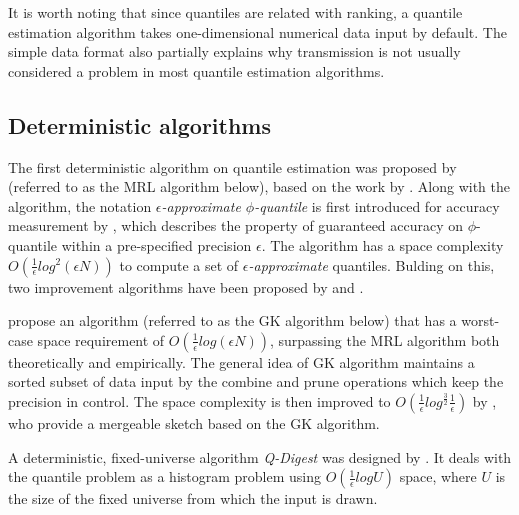 It is worth noting that since quantiles are related with ranking, a quantile estimation algorithm takes one-dimensional numerical data input by default. The simple data format also partially explains why transmission is not usually considered a problem in most quantile estimation algorithms.
\subsection{Deterministic algorithms}
\label{deterministic}
The first deterministic algorithm on quantile estimation was proposed by \citeauthor{mankuApproximateMediansOthera}\cite{mankuApproximateMediansOthera} (referred to as the MRL algorithm below), based on the work by \citeauthor{munroSelectionSortingLimited1980}\cite{munroSelectionSortingLimited1980}. Along with the algorithm, the notation \textit{$\epsilon$-approximate $\phi$-quantile} is first introduced for accuracy measurement by \citeauthor{mankuApproximateMediansOthera}, which describes the property of guaranteed accuracy on $\phi$-quantile within a pre-specified precision $\epsilon$. The algorithm has a space complexity $O(\frac{1}{\epsilon}log^2 (\epsilon N))$ to compute a set of \textit{$\epsilon$-approximate} quantiles. Bulding on this, two improvement algorithms have been proposed by \citeauthor{greenwaldQuantilesEquidepthHistograms2016a}\cite{greenwaldQuantilesEquidepthHistograms2016a} and \citeauthor{shrivastavaMediansNewAggregation2004}\cite{shrivastavaMediansNewAggregation2004}.

\citeauthor{greenwaldQuantilesEquidepthHistograms2016a}\cite{greenwaldQuantilesEquidepthHistograms2016a} propose an algorithm (referred to as the GK algorithm below) that has a worst-case space requirement of $O(\frac{1}{\epsilon}log(\epsilon N))$, surpassing the MRL algorithm both theoretically and empirically. The general idea of GK algorithm maintains a sorted subset of data input by the combine and prune operations which keep the precision in control. The space complexity is then improved to $O(\frac{1}{\epsilon}log^{\frac{3}{2}}\frac{1}{\epsilon})$ by \citeauthor{agarwalMergeableSummaries}\cite{agarwalMergeableSummaries}, who provide a mergeable sketch based on the GK algorithm.

A deterministic, fixed-universe algorithm \textit{Q-Digest} was designed by \citeauthor{shrivastavaMediansNewAggregation2004}\cite{shrivastavaMediansNewAggregation2004}. It deals with the quantile problem as a histogram problem using $O (\frac{1}{\epsilon}log U)$ space, where $U$ is the size of the fixed universe from which the input is drawn.


